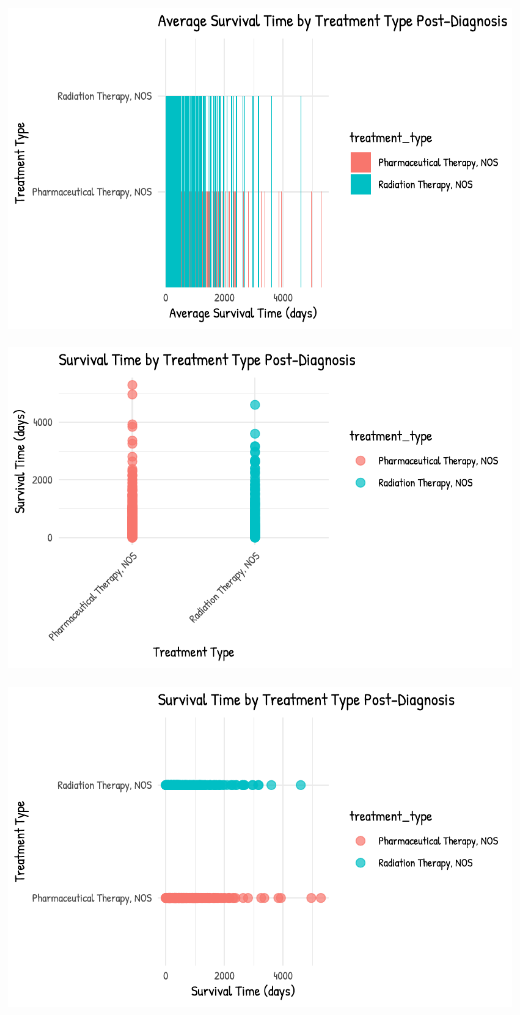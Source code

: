 \documentclass[
  letterpaper,
  DIV=11,
  numbers=noendperiod]{scrartcl}
\begin{document}
\includegraphics{paper_files/figure-pdf/unnamed-chunk-4-11.pdf}

\includegraphics{paper_files/figure-pdf/unnamed-chunk-4-12.pdf}

\includegraphics{paper_files/figure-pdf/unnamed-chunk-4-13.pdf}
\end{document}
